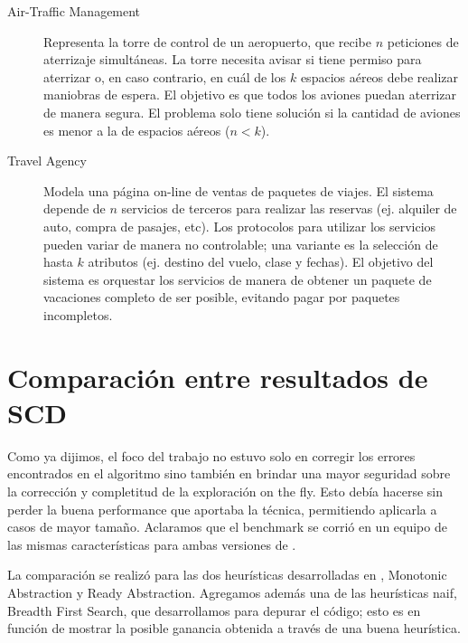 \begin{description}
    \item [Air-Traffic Management] Representa la torre de control de un aeropuerto, que recibe $n$ peticiones de aterrizaje simultáneas. La torre necesita avisar si tiene permiso para aterrizar o, en caso contrario, en cuál de los $k$ espacios aéreos debe realizar maniobras de espera. El objetivo es que todos los aviones puedan aterrizar de manera segura. El problema solo tiene solución si la cantidad de aviones es menor a la de espacios aéreos ($n<k$).
    
    \item [Travel Agency] Modela una página on-line de ventas de paquetes de viajes. El sistema depende de $n$ servicios de terceros para realizar las reservas (ej. alquiler de auto, compra de pasajes, etc). Los protocolos para utilizar los servicios pueden variar de manera no controlable; una variante es la selección de hasta $k$ atributos (ej. destino del vuelo, clase y fechas). El objetivo del sistema es orquestar los servicios de manera de obtener un paquete de vacaciones completo de ser posible, evitando pagar por paquetes incompletos.
\end{description}

\section{Comparación entre resultados de SCD}
Como ya dijimos, el foco del trabajo no estuvo solo en corregir los errores encontrados en el algoritmo sino también en brindar una mayor seguridad sobre la corrección y completitud de la exploración on the fly. Esto debía hacerse sin perder la buena performance que aportaba la técnica, permitiendo aplicarla a casos de mayor tamaño. Aclaramos que el benchmark se corrió en un equipo de las mismas características para ambas versiones de \DCS.

La comparación se realizó para las dos heurísticas desarrolladas en \cite{tesisDani}, Monotonic Abstraction y Ready Abstraction. Agregamos además una de las heurísticas naif, Breadth First Search, que desarrollamos para depurar el código; esto es en función de mostrar la posible ganancia obtenida a través de una buena heurística.

